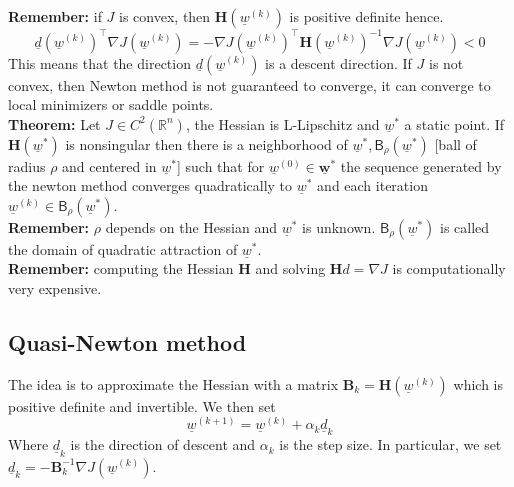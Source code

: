 \textbf{Remember:} if $J$ is convex, then $\mathbf{H} (\underline{w}^{(k)})$ is positive definite hence. 
\[
    \underline{d}(\underline{w}^{(k)})^\intercal \nabla J(\underline{w}^{(k)}) = - \nabla J(\underline{w}^{(k)})^\intercal \mathbf{H} (\underline{w}^{(k)})^{-1}\nabla J(\underline{w}^{(k)}) < 0
\]
This means that the direction $\underline{d}(\underline{w}^{(k)})$ is a descent direction. If $J$ is not convex, then Newton method is not guaranteed to converge, it can converge to local minimizers or saddle points.\\

\textbf{Theorem:} Let $J \in C^2(\mathbb{R}^n)$, the Hessian is L-Lipschitz and $\underline{w}^*$ a static point. If $\mathbf{H} (\underline{w}^*)$ is nonsingular then there is a neighborhood of $\underline{w}^*, \mathsf{B}_{\rho}(\underline{w}^*)$ [ball of radius $\rho$ and centered in $\underline{w}^*$] such that for $\underline{w}^{(0)} \in \mathbf{\underline{w}^*}$ the sequence generated by the newton method converges quadratically to $\underline{w}^*$ and each iteration $\underline{w}^{(k)} \in \mathsf{B}_{\rho}(\underline{w}^*)$.\\

\textbf{Remember: } $\rho$ depends on the Hessian and $\underline{w}^*$ is unknown. $\mathsf{B}_{\rho}(\underline{w}^*)$ is called the domain of quadratic attraction of $\underline{w}^*$.\\

\textbf{Remember: } computing the Hessian $\mathbf{H}$ and solving $\mathbf{H}d = \nabla J $ is computationally very expensive.\\

\subsection{Quasi-Newton method}
The idea is to approximate the Hessian with a matrix $\mathbf{B}_k = \mathbf{H}(\underline{w}^{(k)})$ which is positive definite and invertible. We then set 
\[
    \underline{w}^{(k+1)} = \underline{w}^{(k)} + \alpha_k \underline{d}_k 
\]
Where $\underline{d}_k$ is the direction of descent and $\alpha_k$ is the step size. In particular, we set $\underline{d}_k = - \mathbf{B}_k^{-1}\nabla J(\underline{w}^{(k)})$.\\

